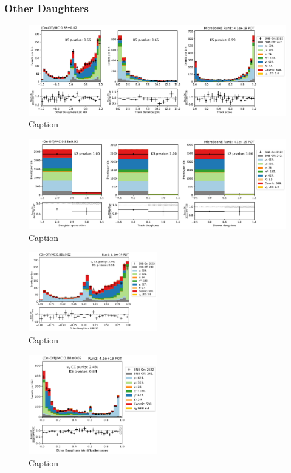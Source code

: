 \subsubsection{Other Daughters}

\begin{figure}
    \centering
    \includegraphics[width=\textwidth]{NueCCsel/Images/run1/pre_daughter_1.pdf}
    \caption{Caption}
    \label{fig:pre_daughter_1}
\end{figure}

\begin{figure}
    \centering
    \includegraphics[width=\textwidth]{NueCCsel/Images/run1/pre_daughter_2.pdf}
    \caption{Caption}
    \label{fig:pre_daughter_2}
\end{figure}

\begin{figure}
    \centering
    \includegraphics[width=0.5\textwidth]{NueCCsel/Images/run1/pre_daughter_pid.pdf}
    \caption{Caption}
    \label{fig:pre_daughter_pid}
\end{figure}

\begin{figure}
    \centering
    \includegraphics[width=0.5\textwidth]{NueCCsel/Images/run1/pre_daughter_score.pdf}
    \caption{Caption}
    \label{fig:pre_daughter_score}
\end{figure}

